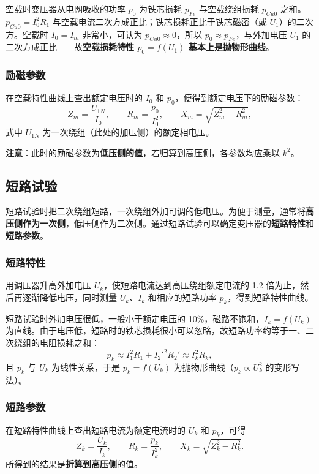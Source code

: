 空载时变压器从电网吸收的功率 $p_0$ 为铁芯损耗 $p_{Fe}$ 与空载绕组损耗 $p_{Cu0}$ 之和。$p_{Cu0}=I_0^2R_1$ 与空载电流二次方成正比；铁芯损耗正比于铁芯磁密（或 $U_1$）的二次方。空载时 $I_0=I_m$ 非常小，可认为 $p_{Cu0}\approx0$，所以 $p_0\approx p_{Fe}$，与外加电压 $U_1$ 的二次方成正比——故\textbf{空载损耗特性 $p_0=f(U_1)$ 基本上是抛物形曲线}。

\subsubsection{励磁参数}
在空载特性曲线上查出额定电压时的 $I_0$ 和 $p_0$，便得到额定电压下的励磁参数：
\begin{equation}
Z_m=\frac{U_{1N}}{I_0},\qquad
R_m=\frac{p_0}{I_0^{2}},\qquad
X_m=\sqrt{Z_m^{2}-R_m^{2}} ,
\end{equation}
式中 $U_{1N}$ 为一次绕组（此处的加压侧）的额定相电压。

\textbf{注意}：此时的励磁参数为\textbf{低压侧的值}，若归算到高压侧，各参数均应乘以 $k^2$。

\subsection{短路试验}
短路试验时把二次绕组短路，一次绕组外加可调的低电压。为便于测量，通常将\textbf{高压侧作为一次侧}，低压侧作为二次侧。通过短路试验可以确定变压器的\textbf{短路特性}和\textbf{短路参数}。

\subsubsection{短路特性}
用调压器升高外加电压 $U_k$，使短路电流达到高压绕组额定电流的 1.2 倍为止，然后再逐渐降低电压，同时测量 $U_k$、$I_k$ 和相应的短路功率 $p_k$，得到短路特性曲线。

短路试验时外加电压很低，一般小于额定电压的 10\%，磁路不饱和，$I_k=f(U_k)$ 为直线。由于电压低，短路时的铁芯损耗很小可以忽略，故短路功率约等于一、二次绕组的电阻损耗之和：
\begin{equation}
p_k\approx I_1^{2}R_1+I_2'^{2}R_2'\approx I_k^{2}R_k ,
\end{equation}
且 $p_k$ 与 $U_k$ 为线性关系，于是 $p_k=f(U_k)$ 为抛物形曲线（$p_k\propto U_k^2$ 的变形写法）。

\subsubsection{短路参数}
在短路特性曲线上查出短路电流为额定电流时的 $U_k$ 和 $p_k$，可得
\begin{equation}
Z_k=\frac{U_k}{I_k},\qquad
R_k=\frac{p_k}{I_k^{2}},\qquad
X_k=\sqrt{Z_k^{2}-R_k^{2}} .
\end{equation}
所得到的结果是\textbf{折算到高压侧}的值。

